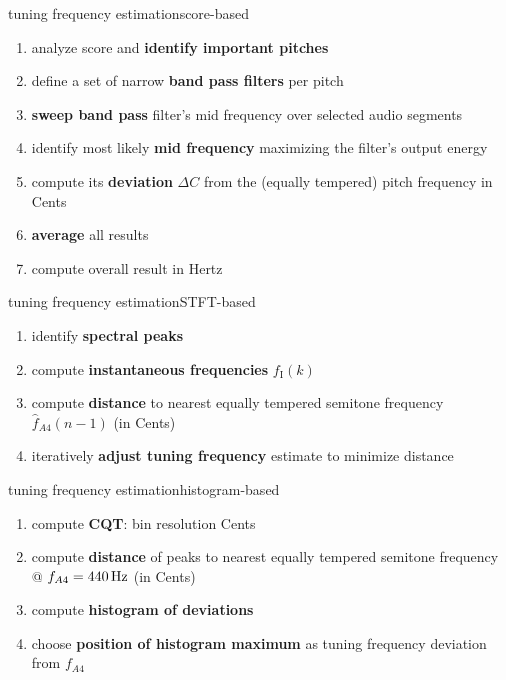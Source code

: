 	\begin{frame}{tuning frequency estimation}{score-based}
		\begin{enumerate}
			\item	analyze score and \textbf{identify important pitches}
			\item<2->	define a set of narrow \textbf{band pass filters} per pitch
			\item<3->	\textbf{sweep band pass} filter's  mid frequency over selected audio segments
			\item<4->	identify most likely \textbf{mid frequency} maximizing the filter's output energy 
            \item<5->  compute its \textbf{deviation} $\Delta C$ from the (equally tempered) pitch frequency in Cents
			\item<6->	\textbf{average} all results
			\item<7->	compute overall result in Hertz
		\end{enumerate}
	\end{frame}
	\begin{frame}{tuning frequency estimation}{STFT-based}
		\begin{enumerate}
			\item	identify \textbf{spectral peaks}
			\item<2->	compute \textbf{instantaneous frequencies} $f_\mathrm{I}(k)$
			\item<3->	compute \textbf{distance} to nearest equally tempered semitone frequency $\hat{f}_{A4}(n-1)$ (in Cents)
			\item<4->	iteratively \textbf{adjust tuning frequency} estimate to minimize distance
		\end{enumerate}
	\end{frame}
	\begin{frame}{tuning frequency estimation}{histogram-based}
		\begin{enumerate}
			\item	compute \textbf{CQT}: bin resolution \unit[10]{Cents}
			\item<2->	compute \textbf{distance} of peaks to nearest equally tempered semitone frequency @ $f_{A4}=\unit[440]{Hz}$ (in Cents)
			\item<3->	compute \textbf{histogram of deviations}
			\item<4->	choose \textbf{position of histogram maximum} as tuning frequency deviation from $f_{A4}$
		\end{enumerate}
	\end{frame}
